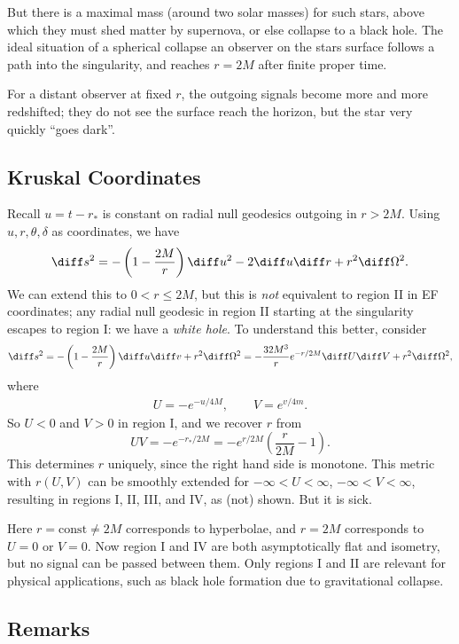 \documentclass[12pt]{article}
\begin{document}
But there is a maximal mass (around two solar masses) for such stars, above which they must shed matter by supernova, or else collapse to a black hole. The ideal situation of a spherical collapse an observer on the stars surface follows a path into the singularity, and reaches $r = 2M$ after finite proper time.

For a distant observer at fixed $r$, the outgoing signals become more and more redshifted; they do not see the surface reach the horizon, but the star very quickly ``goes dark''.

\subsection{Kruskal Coordinates}
\label{sub:kc}

Recall $u = t - r_\ast$ is constant on radial null geodesics outgoing in $r > 2M$. Using $u, r, \theta, \delta$ as coordinates, we have
\[
\diff s^2 = - \left( 1 - \frac{2M}{r} \right)\diff u^2 - 2 \diff u \diff r + r^2 \diff \Omega^2.
\]
We can extend this to $0 < r \leq 2M$, but this is \emph{not} equivalent to region II in EF coordinates; any radial null geodesic in region II starting at the singularity escapes to region I: we have a \emph{white hole}. To understand this better, consider
\[
\diff s^2 = - \left( 1 - \frac{2M}{r} \right)\diff u \diff v + r^2 \diff \Omega^2 = - \frac{32 M^3}{r} e^{-r/2M} \diff U \diff V + r^2 \diff \Omega^2,
\]
where
\begin{align*}
	U = -e^{-u/4M}, \qquad V = e^{v/4m}.
\end{align*}
So $U < 0$ and $V > 0$ in region I, and we recover $r$ from
\[
UV = - e^{-r_\ast/2M} = - e^{r/2M} \left( \frac{r}{2M} - 1 \right).
\]
This determines $r$ uniquely, since the right hand side is monotone. This metric with $r(U, V)$ can be smoothly extended for $-\infty < U < \infty$, $-\infty < V < \infty$, resulting in regions I, II, III, and IV, as (not) shown. But it is sick.

Here $r = \mathrm{const} \neq 2M$ corresponds to hyperbolae, and $r = 2M$ corresponds to $U = 0$ or $V = 0$. Now region I and IV are both asymptotically flat and isometry, but no signal can be passed between them. Only regions I and II are relevant for physical applications, such as black hole formation due to gravitational collapse.

\subsection{Remarks}
\label{sub:rem}
\end{document}

